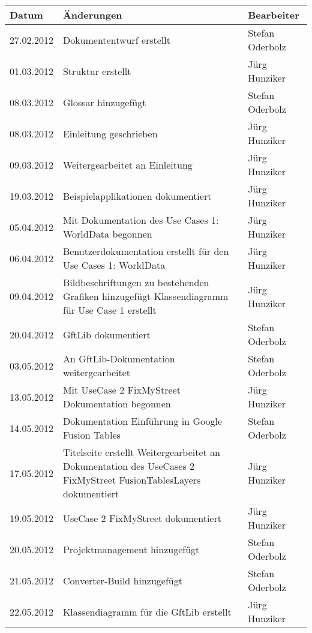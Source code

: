 \begin{longtable}{|p{0.15\threecelltabwidth}|p{0.65\threecelltabwidth}|p{0.2\threecelltabwidth}|}
\hline 
\textbf{Datum} & \textbf{Änderungen} & \textbf{Bearbeiter} \\ 
\hline 
27.02.2012 & Dokumententwurf erstellt & Stefan Oderbolz \\ 
\hline 
01.03.2012 & Struktur erstellt & Jürg Hunziker \\ 
\hline 
08.03.2012  & Glossar hinzugefügt & Stefan Oderbolz \\
\hline
08.03.2012  & Einleitung geschrieben & Jürg Hunziker \\
\hline
09.03.2012 & Weitergearbeitet an Einleitung & Jürg Hunziker \\ 
\hline
19.03.2012  & Beispielapplikationen dokumentiert & Jürg Hunziker \\
\hline 
05.04.2012 & Mit Dokumentation des Use Cases 1: WorldData begonnen & Jürg Hunziker \\ 
\hline 
06.04.2012 & Benutzerdokumentation erstellt für den Use Cases 1: WorldData & Jürg Hunziker \\ 
\hline 
09.04.2012 & Bildbeschriftungen zu bestehenden Grafiken hinzugefügt \newline Klassendiagramm für Use Case 1 erstellt & Jürg Hunziker \\ 
\hline 
20.04.2012  & GftLib dokumentiert & Stefan Oderbolz \\
\hline
03.05.2012  & An GftLib-Dokumentation weitergearbeitet & Stefan Oderbolz \\
\hline
13.05.2012  & Mit UseCase 2 FixMyStreet Dokumentation begonnen & Jürg Hunziker \\
\hline
14.05.2012  & Dokumentation Einführung in Google Fusion Tables & Stefan Oderbolz \\
\hline
17.05.2012  & Titelseite erstellt \newline Weitergearbeitet an Dokumentation des UseCases 2 FixMyStreet \newline FusionTablesLayers dokumentiert & Jürg Hunziker \\
\hline
19.05.2012  & UseCase 2 FixMyStreet dokumentiert & Jürg Hunziker \\
\hline
20.05.2012  & Projektmanagement hinzugefügt & Stefan Oderbolz \\
\hline
21.05.2012  & Converter-Build hinzugefügt & Stefan Oderbolz \\
\hline
22.05.2012  & Klassendiagramm für die GftLib erstellt & Jürg Hunziker \\

\end{longtable}

